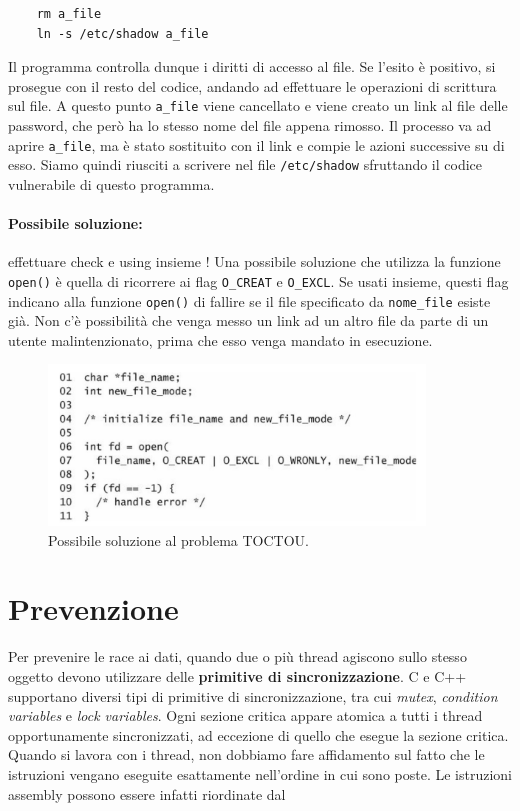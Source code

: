 \begin{lstlisting}
    rm a_file
    ln -s /etc/shadow a_file
\end{lstlisting}

Il programma controlla dunque i diritti di accesso al file.
Se l'esito è positivo, si prosegue con il resto del codice, andando ad effettuare
le operazioni di scrittura sul file.
A questo punto \verb|a_file| viene cancellato e viene creato un link al file delle password,
che però ha lo stesso nome del file appena rimosso. Il processo va ad aprire \verb|a_file|,
ma è stato sostituito con il link e compie le azioni successive su di esso.
Siamo quindi riusciti a scrivere nel file \verb|/etc/shadow| sfruttando il codice
vulnerabile di questo programma.

\paragraph{Possibile soluzione:}
effettuare check e using insieme !
Una possibile soluzione che utilizza la funzione
\verb|open()| è quella di ricorrere ai flag \verb|O_CREAT| e \verb|O_EXCL|.
Se usati insieme, questi flag indicano alla funzione \verb|open()| di fallire
se il file specificato da \verb|nome_file| esiste già.
Non c'è possibilità che venga messo un link ad un altro file da parte di un
utente malintenzionato, prima che esso venga mandato in esecuzione.

\begin{figure}
    \centering
    \includegraphics[width=10cm, keepaspectratio]{capitoli/secure_coding/img/cap_6/esempio_open.png}
    \caption{Possibile soluzione al problema TOCTOU.}
\end{figure}

\section{Prevenzione}

Per prevenire le race ai dati, quando due o più thread agiscono sullo stesso
oggetto devono utilizzare delle \textbf{primitive di sincronizzazione}.
C e C++ supportano diversi tipi di primitive di sincronizzazione, tra cui \textit{mutex},
\textit{condition variables} e \textit{lock variables}.
Ogni sezione critica appare atomica a tutti i thread opportunamente sincronizzati,
ad eccezione di quello che esegue la sezione critica.
Quando si lavora con i thread, non dobbiamo fare affidamento sul fatto che le istruzioni
vengano eseguite
esattamente nell'ordine in cui sono poste.
Le istruzioni assembly possono essere infatti riordinate dal

